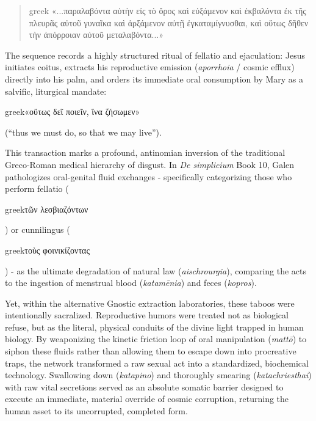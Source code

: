 \documentclass[11pt,twoside,a4paper]{article}
\begin{document}
\begin{quote}
\begin{foreignlanguage}{greek}
«...παραλαβόντα αὐτὴν εἰς τὸ ὄρος καὶ εὐξάμενον καὶ ἐκβαλόντα ἐκ τῆς πλευρᾶς αὐτοῦ γυναῖκα καὶ ἀρξάμενον αὐτῇ ἐγκαταμίγνυσθαι, καὶ οὕτως δῆθεν τὴν ἀπόρροιαν αὐτοῦ μεταλαβόντα...»
\end{foreignlanguage}
\end{quote}

The sequence records a highly structured ritual of fellatio and ejaculation: Jesus initiates 
coitus, extracts his reproductive emission (\textit{aporrhoia} / cosmic efflux) directly into his 
palm, and orders its immediate oral consumption by Mary as a salvific, liturgical mandate: 
\begin{foreignlanguage}{greek}«οὕτως δεῖ ποιεῖν, ἵνα ζήσωμεν»\end{foreignlanguage} (``thus we must do, so that we may live'').

This transaction marks a profound, antinomian inversion of the traditional Greco-Roman medical 
hierarchy of disgust. In \textit{De simplicium} Book 10, Galen pathologizes oral-genital fluid 
exchanges - specifically categorizing those who perform fellatio (\begin{foreignlanguage}{greek}τῶν λεσβιαζόντων\end{foreignlanguage}) 
or cunnilingus (\begin{foreignlanguage}{greek}τοὺς φοινικίζοντας\end{foreignlanguage}) - as the ultimate 
degradation of natural law (\textit{aischrourgia}), comparing the acts to the ingestion of 
menstrual blood (\textit{katamēnia}) and feces (\textit{kopros}). 

Yet, within the alternative Gnostic extraction laboratories, these taboos were intentionally 
sacralized. Reproductive humors were treated not as biological refuse, but as the literal, physical 
conduits of the divine light trapped in human biology. By weaponizing the kinetic friction loop of oral 
manipulation (\textit{mattō}) to siphon these fluids rather than allowing them to escape down into procreative 
traps, the network transformed a raw sexual act into a standardized, biochemical technology. Swallowing 
down (\textit{katapino}) and thoroughly smearing (\textit{katachriesthai}) with raw vital secretions served 
as an absolute somatic barrier designed to execute an immediate, material override of cosmic corruption, 
returning the human asset to its uncorrupted, completed form.
\end{document}
